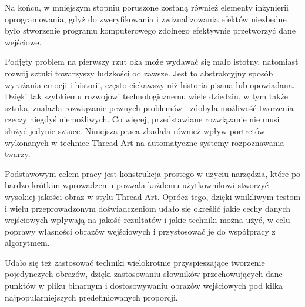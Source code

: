 \documentclass[a4paper, 12pt, polish, twoside]{extreport}
\begin{document}
    Na końcu, w mniejszym stopniu poruszone zostaną również elementy inżynierii oprogramowania, gdyż do zweryfikowania i zwizualizowania efektów niezbędne było stworzenie programu komputerowego zdolnego efektywnie przetworzyć dane wejściowe.
    
    Podjęty problem na pierwszy rzut oka może wydawać się mało istotny, natomiast rozwój sztuki towarzyszy ludzkości od zawsze. Jest to abstrakcyjny sposób wyrażania emocji i historii, często ciekawszy niż historia pisana lub opowiadana. Dzięki tak szybkiemu rozwojowi technologicznemu wiele dziedzin, w tym także sztuka, znalazła rozwiązanie pewnych problemów i zdobyła możliwość tworzenia rzeczy niegdyś niemożliwych. Co więcej, przedstawiane rozwiązanie nie musi służyć jedynie sztuce. Niniejsza praca zbadała również wpływ portretów wykonanych w technice Thread Art na automatyczne systemy rozpoznawania twarzy.
    
    Podstawowym celem pracy jest konstrukcja prostego w użyciu narzędzia, które po bardzo krótkim wprowadzeniu pozwala każdemu użytkownikowi stworzyć wysokiej jakości obraz w stylu Thread Art. Oprócz tego, dzięki wnikliwym testom i wielu przeprowadzonym doświadczeniom udało się określić jakie cechy danych wejściowych wpływają na jakość rezultatów i jakie techniki można użyć, w celu poprawy własności obrazów wejściowych i przystosować je do współpracy z algorytmem.
    
    Udało się też zastosować techniki wielokrotnie przyspieszające tworzenie pojedynczych obrazów, dzięki zastosowaniu słowników przechowujących dane punktów w pliku binarnym i dostosowywaniu obrazów wejściowych pod kilka najpopularniejszych predefiniowanych proporcji.  
    
\end{document}
